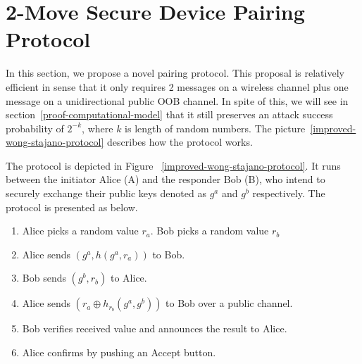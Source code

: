 \section{2-Move Secure Device Pairing Protocol}\label{chap42move}

In this section, we propose a novel pairing protocol. This proposal is relatively efficient in sense that it only requires 2 messages on a wireless channel plus one message on a unidirectional public OOB channel. In spite of this, we will see in section~\ref{proof-computational-model} that it still preserves an attack success probability of $2^{-k}$, where $k$ is length of random numbers. The picture~\ref{improved-wong-stajano-protocol} describes how the protocol works. 

The protocol is depicted in Figure ~\ref{improved-wong-stajano-protocol}. It runs between the initiator Alice (A) and the responder Bob (B), who intend to securely exchange their public keys denoted as $g^a$ and $g^b$ respectively. The protocol is presented as below.

\begin{enumerate}
\item Alice picks a random value $r_a$. Bob picks a random value $r_b$
\item Alice sends $(g^a,h(g^a,r_a))$ to Bob.
\item Bob sends $(g^b,r_b)$ to Alice.
\item Alice sends $(r_a \oplus h_{r_b}(g^a,g^b) )$ to Bob over a public channel. 
\item Bob verifies received value and announces the result to Alice. 
\item Alice confirms by pushing an Accept button. 
\end{enumerate}

